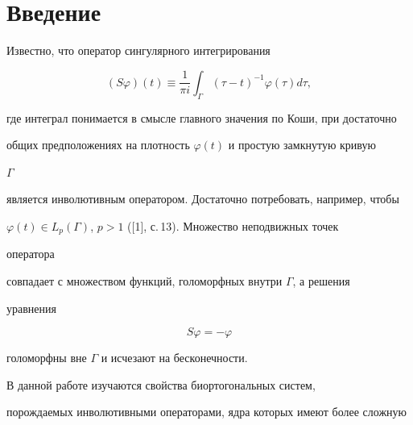  




\maketitle 


\label{begin} 


 


 


 


\section*{Введение} 


 


Известно, что оператор сингулярного интегрирования 


$$ 


(S\varphi)(t)\equiv\frac{1}{\pi i}\int_\Gamma(\tau-t)^{-1}


\varphi(\tau)d\tau, 


$$ 


где интеграл понимается в смысле главного значения по Коши, при достаточно 


общих предположениях на плотность $\varphi(t)$ и простую замкнутую кривую 


$\Gamma$ 


является инволютивным оператором. Достаточно потребовать, например, чтобы 


$\varphi(t)\in L_p(\Gamma)$, $p>1$ ([1], с.\,13). Множество неподвижных точек 


оператора 


совпадает с множеством функций, голоморфных внутри $\Gamma$, а решения 


уравнения 


\begin{equation} 


S\varphi=-\varphi 


\end{equation} 


голоморфны вне $\Gamma$ и исчезают на бесконечности. 


 


В данной работе изучаются свойства биортогональных систем, 


порождаемых инволютивными операторами, ядра которых имеют более сложную 


